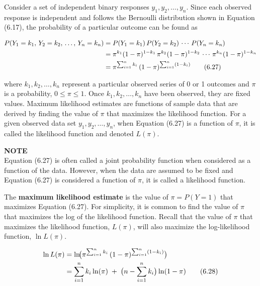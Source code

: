 \documentclass[
]{report}
\begin{document}
Consider a set of independent binary responses \(y_1, y_2, \dots, y_n\). Since each observed response is independent and follows the Bernoulli distribution shown in Equation (6.17), the probability of a particular outcome can be found as

\begin{align}
P(Y_1 = k_1,\,Y_2 = k_2,\,\dots,\,Y_n = k_n) 
&= P(Y_1 = k_1)\,P(Y_2 = k_2)\,\cdots\,P(Y_n = k_n) \notag \\
&= \pi^{k_1}(1 - \pi)^{1-k_1}\,\pi^{k_2}(1 - \pi)^{1-k_2}\,\cdots\,\pi^{k_n}(1 - \pi)^{1-k_n} \notag \\
&= \pi^{\sum_{i=1}^n k_i}\,(1 - \pi)^{\sum_{i=1}^n (1 - k_i)}
\tag{6.27}
\end{align}

where \(k_1, k_2, \dots, k_n\) represent a particular observed series of 0 or 1 outcomes and \(\pi\) is a probability, \(0 \le \pi \le 1\). Once \(k_1, k_2, \dots, k_n\) have been observed, they are fixed values. Maximum likelihood estimates are functions of sample data that are derived by finding the value of \(\pi\) that maximizes the likelihood function. For a given observed data set \(y_1, y_2, \dots, y_n\), when Equation (6.27) is a function of \(\pi\), it is called the likelihood function and denoted \(L(\pi)\).

\large

\textbf{NOTE}\\
Equation (6.27) is often called a joint probability function when considered as a function of the data. However, when the data are assumed to be fixed and Equation (6.27) is considered a function of \(\pi\), it is called a likelihood function.\\
\normalsize

The \textbf{maximum likelihood estimate} is the value of \(\pi = P(Y = 1)\) that maximizes Equation (6.27). For simplicity, it is common to find the value of \(\pi\) that maximizes the log of the likelihood function. Recall that the value of \(\pi\) that maximizes the likelihood function, \(L(\pi)\), will also maximize the log-likelihood function, \(\ln L(\pi)\).

\begin{align}
\ln L(\pi)
&= \ln\!\bigl(\pi^{\sum_{i=1}^n k_i}\,(1 - \pi)^{\sum_{i=1}^n (1 - k_i)}\bigr) \notag \\
&= \sum_{i=1}^n k_i \ln(\pi)\;+\;\bigl(n - \sum_{i=1}^n k_i\bigr)\ln(1 - \pi)
\tag{6.28}
\end{align}

\large
\end{document}
